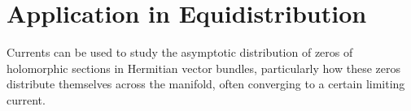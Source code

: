 \documentclass{article}
\begin{document}
\section*{Application in Equidistribution}

Currents can be used to study the asymptotic distribution of zeros of
holomorphic sections in Hermitian vector bundles, particularly how these zeros
distribute themselves across the manifold, often converging to a certain
limiting current.
\end{document}
